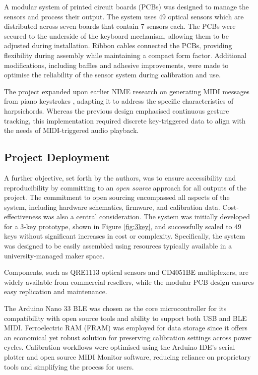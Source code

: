 
A modular system of printed circuit boards (PCBs) was designed to manage the sensors and process their output. The system uses 49 optical sensors which are distributed across seven boards that contain 7 sensors each. The PCBs were secured to the underside of the keyboard mechanism, allowing them to be adjusted during installation. Ribbon cables connected the PCBs, providing flexibility during assembly while maintaining a compact form factor. Additional modifications, including baffles and adhesive improvements, were made to optimise the reliability of the sensor system during calibration and use.

The project expanded upon earlier NIME research on generating MIDI messages from piano keystrokes \cite{McPherson2013}, adapting it to address the specific characteristics of harpsichords. Whereas the previous design emphasised continuous gesture tracking, this implementation required discrete key-triggered data to align with the needs of MIDI-triggered audio playback. 

\subsection{Project Deployment}
A further objective, set forth by the authors, was to ensure accessibility and reproducibility by committing to an \emph{open source} approach for all outputs of the project. The commitment to open sourcing encompassed all aspects of the system, including hardware schematics, firmware, and calibration data. Cost-effectiveness was also a central consideration. The system was initially developed for a 3-key prototype, shown in Figure \ref{fig:3key}, and successfully scaled to 49 keys without significant increases in cost or complexity. Specifically, the system was designed to be easily assembled using resources typically available in a university-managed maker space.

Components, such as QRE1113 optical sensors and CD4051BE multiplexers, are widely available from commercial resellers, while the modular PCB design ensures easy replication and maintenance.

The Arduino Nano 33 BLE was chosen as the core microcontroller for its compatibility with open source tools and ability to support both USB and BLE MIDI. Ferroelectric RAM (FRAM) was employed for data storage since it offers an economical yet robust solution for preserving calibration settings across power cycles. Calibration workflows were optimised using the Arduino IDE’s serial plotter and open source MIDI Monitor software, reducing reliance on proprietary tools and simplifying the process for users. 

